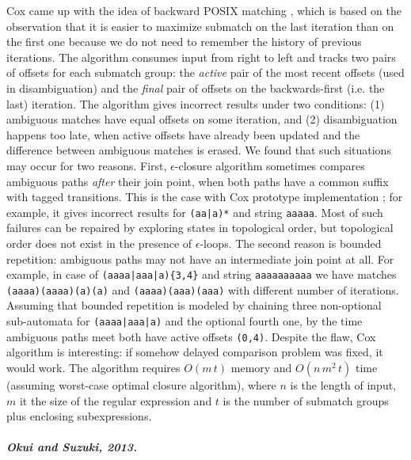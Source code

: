 \documentclass[AMA,STIX1COL]{WileyNJD-v2}
\begin{document}
Cox came up with the idea of backward POSIX matching \cite{Cox09},
which is based on the observation that it is easier to maximize submatch on the last iteration than on the first one
because we do not need to remember the history of previous iterations.
The algorithm consumes input from right to left
and tracks two pairs of offsets for each submatch group:
the \emph{active} pair of the most recent offsets (used in disambiguation)
and the \emph{final} pair of offsets on the backwards-first (i.e. the last) iteration.
The algorithm gives incorrect results under two conditions:
(1) ambiguous matches have equal offsets on some iteration,
and (2) disambiguation happens too late, when active offsets have already been updated and the difference between ambiguous matches is erased.
We found that such situations may occur for two reasons.
First, $\epsilon$-closure algorithm sometimes compares ambiguous paths \emph{after} their join point,
when both paths have a common suffix with tagged transitions.
This is the case with Cox prototype implementation \cite{Cox09}; for example, it gives incorrect results for \texttt{(aa|a)*} and string \texttt{aaaaa}.
Most of such failures can be repaired by exploring states in topological order,
but topological order does not exist in the presence of $\epsilon$-loops.
The second reason is bounded repetition: ambiguous paths may not have an intermediate join point at all.
For example, in case of \texttt{(aaaa|aaa|a)\{3,4\}} and string \texttt{aaaaaaaaaa}
we have matches \texttt{(aaaa)(aaaa)(a)(a)} and \texttt{(aaaa)(aaa)(aaa)}
with different number of iterations.
Assuming that bounded repetition is modeled by chaining three non-optional sub-automata for \texttt{(aaaa|aaa|a)} and the optional fourth one,
by the time ambiguous paths meet both have active offsets \texttt{(0,4)}.
Despite the flaw, Cox algorithm is interesting: if somehow delayed comparison problem was fixed, it would work.
The algorithm requires $O(m \, t)$ memory and $O(n \, m^2 \, t)$ time
(assuming worst-case optimal closure algorithm),
where $n$ is the length of input,
$m$ it the size of the regular expression
and $t$ is the number of submatch groups plus enclosing subexpressions.

\subparagraph{Okui and Suzuki, 2013.}
\end{document}
